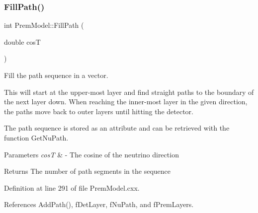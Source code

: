 \subsubsection{\texorpdfstring{Fill\+Path()}{FillPath()}}
{\footnotesize\ttfamily int Prem\+Model\+::\+Fill\+Path (\begin{DoxyParamCaption}\item[{double}]{cosT }\end{DoxyParamCaption})\hspace{0.3cm}{\ttfamily [virtual]}}

Fill the path sequence in a vector.

This will start at the upper-\/most layer and find straight paths to the boundary of the next layer down. When reaching the inner-\/most layer in the given direction, the paths move back to outer layers until hitting the detector.

The path sequence is stored as an attribute and can be retrieved with the function Get\+Nu\+Path.


\begin{DoxyParams}{Parameters}
{\em cosT} & -\/ The cosine of the neutrino direction \\
\hline
\end{DoxyParams}
\begin{DoxyReturn}{Returns}
The number of path segments in the sequence 
\end{DoxyReturn}


Definition at line 291 of file Prem\+Model.\+cxx.



References Add\+Path(), f\+Det\+Layer, f\+Nu\+Path, and f\+Prem\+Layers.


